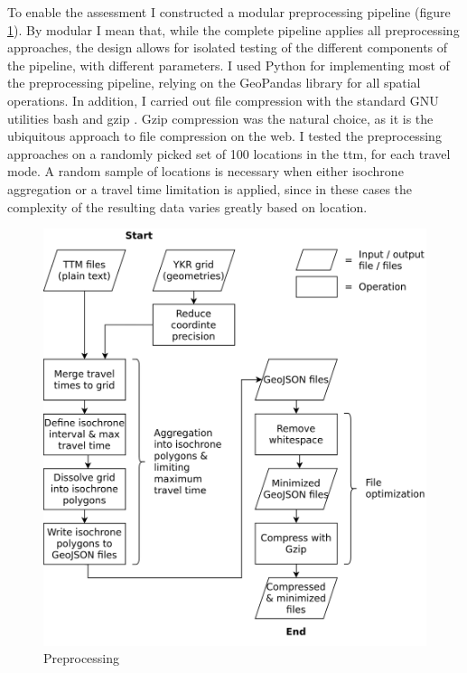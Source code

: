 To enable the assessment
I constructed a modular preprocessing pipeline
(figure \ref{fig:preprocessing}).
By modular I mean that,
while the complete pipeline applies all preprocessing approaches,
the design allows for isolated testing of the
different components of the pipeline, with different parameters.
I used Python \parencite{python} for implementing most of the preprocessing pipeline,
relying on the GeoPandas \parencite{jor2024} library for all spatial operations.
In addition, I carried out file compression with
the standard GNU utilities bash \parencite{bash} and gzip \parencite{gzip}.
Gzip compression was the natural choice,
as it is the ubiquitous approach to file compression on the web. 
I tested the preprocessing approaches on
a randomly picked set of 100 locations in the \acrshort{ttm},
for each travel mode.
A random sample of locations is necessary when either
isochrone aggregation or a travel time limitation is applied,
since in these cases the complexity of the resulting
data varies greatly based on location.

\begin{figure}[H]
	\centering
	\includegraphics[width=\diagramwidth]{visual/figures/diagrams/preprocessing.png}
	\caption{Preprocessing}
	\label{fig:preprocessing}
\end{figure}

